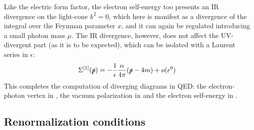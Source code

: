 Like the electric form factor, the electron self-energy too presents an IR divergence on the light-cone $ k^2 = 0 $, which here is manifest as a divergence of the integral over the Feynman parameter $ x $, and it can again be regulated introducing a small photon mass $ \mu $.
The IR divergence, however, does not affect the UV-divergent part (as it is to be expected), which can be isolated with a Laurent series in $ \epsilon $:
\begin{equation}
  \Sigma^{[1]}(\slashed{p}) = - \frac{1}{\epsilon} \frac{\alpha}{4\pi} (\slashed{p} - 4m) + o(\epsilon^0)
  \label{eq:electron-self-energy-div}
\end{equation}
This completes the computation of diverging diagrams in QED: the electron-photon vertex in , the vacuum polarization in  and the electron self-energy in .

\subsection{Renormalization conditions}

